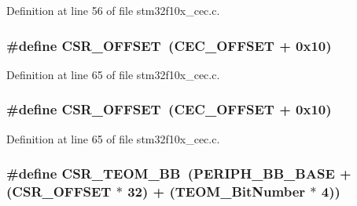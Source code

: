 Definition at line 56 of file stm32f10x\+\_\+cec.\+c.

\subsubsection[{\texorpdfstring{C\+S\+R\+\_\+\+O\+F\+F\+S\+ET}{CSR_OFFSET}}]{\setlength{\rightskip}{0pt plus 5cm}\#define C\+S\+R\+\_\+\+O\+F\+F\+S\+ET~({\bf C\+E\+C\+\_\+\+O\+F\+F\+S\+ET} + 0x10)}\hypertarget{group___c_e_c___private___defines_ga984cbe73312b6d3d355c5053763d499a}{}\label{group___c_e_c___private___defines_ga984cbe73312b6d3d355c5053763d499a}


Definition at line 65 of file stm32f10x\+\_\+cec.\+c.

\subsubsection[{\texorpdfstring{C\+S\+R\+\_\+\+O\+F\+F\+S\+ET}{CSR_OFFSET}}]{\setlength{\rightskip}{0pt plus 5cm}\#define C\+S\+R\+\_\+\+O\+F\+F\+S\+ET~({\bf C\+E\+C\+\_\+\+O\+F\+F\+S\+ET} + 0x10)}\hypertarget{group___c_e_c___private___defines_ga984cbe73312b6d3d355c5053763d499a}{}\label{group___c_e_c___private___defines_ga984cbe73312b6d3d355c5053763d499a}


Definition at line 65 of file stm32f10x\+\_\+cec.\+c.

\subsubsection[{\texorpdfstring{C\+S\+R\+\_\+\+T\+E\+O\+M\+\_\+\+BB}{CSR_TEOM_BB}}]{\setlength{\rightskip}{0pt plus 5cm}\#define C\+S\+R\+\_\+\+T\+E\+O\+M\+\_\+\+BB~({\bf P\+E\+R\+I\+P\+H\+\_\+\+B\+B\+\_\+\+B\+A\+SE} + ({\bf C\+S\+R\+\_\+\+O\+F\+F\+S\+ET} $\ast$ 32) + ({\bf T\+E\+O\+M\+\_\+\+Bit\+Number} $\ast$ 4))}\hypertarget{group___c_e_c___private___defines_ga9ac493d98ce1f6d82b778ace0f2bc7bb}{}\label{group___c_e_c___private___defines_ga9ac493d98ce1f6d82b778ace0f2bc7bb}


